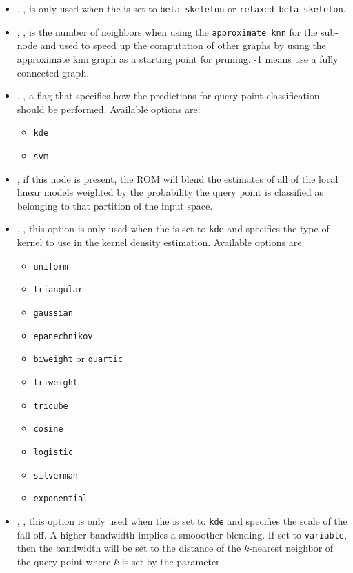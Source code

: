 \begin{itemize}
  \item {}, \xmlDesc{float in the range: (0,2], optional field}, is
  only used when the  is set to \texttt{beta skeleton} or
  \texttt{relaxed beta skeleton}.
  \item {}, , is the number of
  neighbors when using the \texttt{approximate knn} for the 
  sub-node and used to speed up the computation of other graphs by using the
  approximate knn graph as a starting point for pruning. -1 means use a fully
  connected graph.
  \item {}, , a flag that
  specifies how the predictions for query point classification should be
  performed. Available options are:
  \begin{itemize}
    \item \texttt{kde}
    \item \texttt{svm}
  \end{itemize}
  \item {}, if this node is present, the ROM will blend the
  estimates of all of the local linear models weighted by the probability the
  query point is classified as belonging to that partition of the input space.
  \item {}, , this option is only
  used when the  is set to \texttt{kde} and
  specifies the type of kernel to use in the kernel density estimation.
  Available options are:
  \begin{itemize}
    \item \texttt{uniform}
    \item \texttt{triangular}
    \item \texttt{gaussian}
    \item \texttt{epanechnikov}
    \item \texttt{biweight} or \texttt{quartic}
    \item \texttt{triweight}
    \item \texttt{tricube}
    \item \texttt{cosine}
    \item \texttt{logistic}
    \item \texttt{silverman}
    \item \texttt{exponential}
  \end{itemize}
  \item {}, , this
  option is only used when the  is set to
  \texttt{kde} and specifies the scale of the fall-off. A higher bandwidth
  implies a smooother blending. If set to \texttt{variable}, then the bandwidth
  will be set to the distance of the $k$-nearest neighbor of the query point
  where $k$ is set by the  parameter.
\end{itemize}

